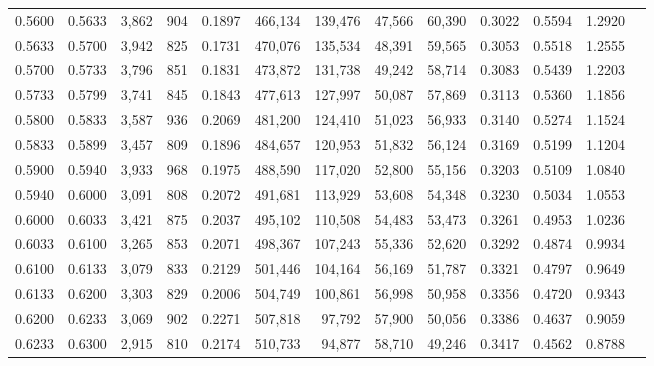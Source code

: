 \begin{tabular}{rrrrrrrrrrrrr}
0.5600 & 0.5633 &  3,862 &   904 &                                     0.1897 & 466,134 & 139,476 &  47,566 &  60,390 & 0.3022 & 0.5594 & 1.2920 \\
0.5633 & 0.5700 &  3,942 &   825 &                                     0.1731 & 470,076 & 135,534 &  48,391 &  59,565 & 0.3053 & 0.5518 & 1.2555 \\
0.5700 & 0.5733 &  3,796 &   851 &                                     0.1831 & 473,872 & 131,738 &  49,242 &  58,714 & 0.3083 & 0.5439 & 1.2203 \\
0.5733 & 0.5799 &  3,741 &   845 &                                     0.1843 & 477,613 & 127,997 &  50,087 &  57,869 & 0.3113 & 0.5360 & 1.1856 \\
0.5800 & 0.5833 &  3,587 &   936 &                                     0.2069 & 481,200 & 124,410 &  51,023 &  56,933 & 0.3140 & 0.5274 & 1.1524 \\
0.5833 & 0.5899 &  3,457 &   809 &                                     0.1896 & 484,657 & 120,953 &  51,832 &  56,124 & 0.3169 & 0.5199 & 1.1204 \\
0.5900 & 0.5940 &  3,933 &   968 &                                     0.1975 & 488,590 & 117,020 &  52,800 &  55,156 & 0.3203 & 0.5109 & 1.0840 \\
0.5940 & 0.6000 &  3,091 &   808 &                                     0.2072 & 491,681 & 113,929 &  53,608 &  54,348 & 0.3230 & 0.5034 & 1.0553 \\
0.6000 & 0.6033 &  3,421 &   875 &                                     0.2037 & 495,102 & 110,508 &  54,483 &  53,473 & 0.3261 & 0.4953 & 1.0236 \\
0.6033 & 0.6100 &  3,265 &   853 &                                     0.2071 & 498,367 & 107,243 &  55,336 &  52,620 & 0.3292 & 0.4874 & 0.9934 \\
0.6100 & 0.6133 &  3,079 &   833 &                                     0.2129 & 501,446 & 104,164 &  56,169 &  51,787 & 0.3321 & 0.4797 & 0.9649 \\
0.6133 & 0.6200 &  3,303 &   829 &                                     0.2006 & 504,749 & 100,861 &  56,998 &  50,958 & 0.3356 & 0.4720 & 0.9343 \\
0.6200 & 0.6233 &  3,069 &   902 &                                     0.2271 & 507,818 &  97,792 &  57,900 &  50,056 & 0.3386 & 0.4637 & 0.9059 \\
0.6233 & 0.6300 &  2,915 &   810 &                                     0.2174 & 510,733 &  94,877 &  58,710 &  49,246 & 0.3417 & 0.4562 & 0.8788 \\

\end{tabular}
